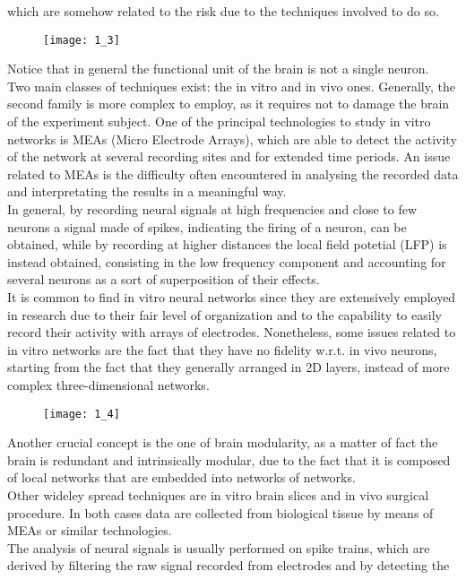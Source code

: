 which are somehow related to the risk due to the techniques involved to do so.
\begin{figure}[H]
    \texttt{[image: 1\_3]}
    \centering
\end{figure}
Notice that in general the functional unit of the brain is not a single neuron.\\
Two main classes of techniques exist: the in vitro and in vivo ones. Generally, the
second family is more complex to employ, as it requires not to damage the brain of
the experiment subject. One of the principal technologies to study in vitro networks
is MEAs (Micro Electrode Arrays), which are able to detect the activity
of the network at several recording sites and for extended time periods. An issue
related to MEAs is the difficulty often encountered in analysing the recorded data
and interpretating the results in a meaningful way.\\
In general, by recording neural signals at high frequencies and close to few
neurons a signal made of spikes, indicating the firing of a neuron, can be obtained,
while by recording at higher distances the local field potetial (LFP) is instead
obtained, consisting in the low frequency component and accounting for several
neurons as a sort of superposition of their effects.\\
It is common to find in vitro neural networks since they are extensively employed in
research due to their fair level of organization and to the capability to easily
record their activity with arrays of electrodes. Nonetheless, some issues related to
in vitro networks are the fact that they have no fidelity w.r.t. in vivo neurons,
starting from the fact that they generally arranged in 2D layers, instead of
more complex three-dimensional networks.
\begin{figure}[H]
    \texttt{[image: 1\_4]}
    \centering
\end{figure}
Another crucial concept is the one of brain modularity, as a matter of fact the brain
is redundant and intrinsically modular, due to the fact that it is composed of
local networks that are embedded into networks of networks.\\
Other wideley spread techniques are in vitro brain slices and in vivo surgical
procedure. In both cases data are collected from biological tissue by means of
MEAs or similar technologies.\\
The analysis of neural signals is usually performed on spike trains, which are
derived by filtering the raw signal recorded from electrodes and by detecting the
